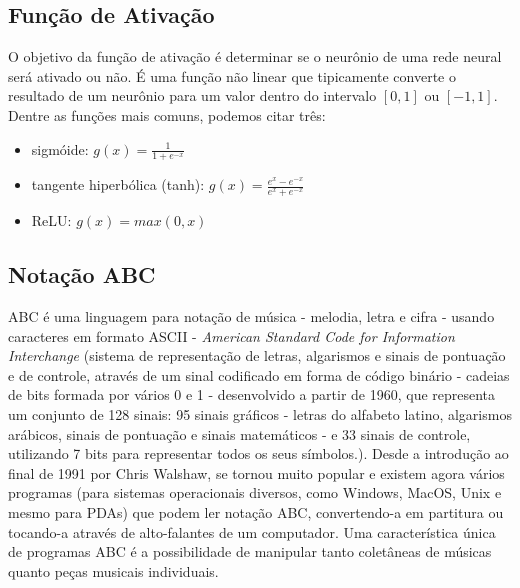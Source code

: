 \documentclass{automatextcc}
\begin{document}
\subsection{Função de Ativação}
O objetivo da função de ativação é determinar se o neurônio de uma rede neural será ativado ou não. É uma função não linear que tipicamente converte o resultado de um neurônio para um valor dentro do intervalo $[0,1]$ ou $[-1,1]$. Dentre as funções mais comuns, podemos citar três:

\begin{itemize}
    \item sigmóide: $g(x) = \frac{1}{1+e^{-x}}$ 
    \item tangente hiperbólica (tanh): $g(x) = \frac{e^{x}-e^{-x}}{e^{x}+e^{-x}}$
    \item ReLU: $g(x) = max(0,x)$
\end{itemize}


\subsection{Notação ABC}

ABC é uma linguagem para notação de música - melodia, letra e cifra - usando caracteres em formato ASCII - \textit{American Standard Code for Information Interchange} (sistema de representação de letras, algarismos e sinais de pontuação e de controle, através de um sinal codificado em forma de código binário - cadeias de bits formada por vários 0 e 1 - desenvolvido a partir de 1960, que representa um conjunto de 128 sinais: 95 sinais gráficos - letras do alfabeto latino, algarismos arábicos, sinais de pontuação e sinais matemáticos - e 33 sinais de controle, utilizando 7 bits para representar todos os seus símbolos.). Desde a introdução ao final de 1991 por Chris Walshaw, se tornou muito popular e existem agora vários programas (para sistemas operacionais diversos, como Windows, MacOS, Unix e mesmo para PDAs) que podem ler notação ABC, convertendo-a em partitura ou tocando-a através de alto-falantes de um computador. Uma característica única de programas ABC é a possibilidade de manipular tanto coletâneas de músicas quanto peças musicais individuais.
\end{document}
